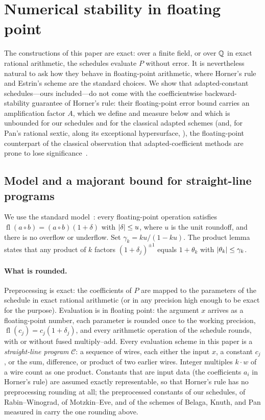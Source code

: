 \section{Numerical stability in floating point}
\label{sec:numerical-stability}

The constructions of this paper are exact: over a finite field, or over $\mathbb{Q}$ in
exact rational arithmetic, the schedules evaluate $P$ without error.  It is
nevertheless natural to ask how they behave in floating-point arithmetic,
where Horner's rule and Estrin's scheme are the standard choices.  We show
that adapted-constant schedules---ours included---do not come with the
coefficientwise backward-stability guarantee of Horner's rule: their
floating-point error bound carries an amplification factor $A$, which we
define and measure below and which is unbounded for our schedules and for
the classical adapted schemes (and, for Pan's rational sextic, along its
exceptional hypersurface, ), the floating-point
counterpart of the classical observation that adapted-coefficient methods
are prone to lose significance~\cite[\S4.6.4]{knuth1997seminumerical}.

\subsection{Model and a majorant bound for straight-line programs}

We use the standard model~\cite[Ch.~2--3]{higham2002accuracy}: every
floating-point operation satisfies
$\operatorname{fl}(a\circ b)=(a\circ b)(1+\delta)$ with $\left\lvert \delta\right\rvert\le u$,
where $u$ is the unit roundoff, and there is no overflow or underflow.  Set
$\gamma_k=ku/(1-ku)$.  The product lemma states that any product of $k$ factors
$(1+\delta_j)^{\pm1}$ equals $1+\theta_k$ with $\left\lvert \theta_k\right\rvert\le\gamma_k$.

\paragraph{What is rounded.}
Preprocessing is exact: the coefficients of $P$ are mapped to the parameters
of the schedule in exact rational arithmetic (or in any precision high enough
to be exact for the purpose).  Evaluation is in floating point: the argument
$x$ arrives as a floating-point number, each parameter is rounded once to the
working precision, $\operatorname{fl}(c_j)=c_j(1+\delta_j)$, and every
arithmetic operation of the schedule rounds, with or without fused
multiply--add.  Every evaluation scheme in this paper is a
\emph{straight-line program} $\mathcal C$: a sequence of wires, each either
the input $x$, a constant $c_j$, or the sum, difference, or product of two
earlier wires.  Integer multiples $k\cdot w$ of a wire count as one product.
Constants that are input data (the coefficients $a_i$ in Horner's rule) are
assumed exactly representable, so that Horner's rule has no preprocessing
rounding at all; the preprocessed constants of our schedules, of
Rabin--Winograd, of Motzkin--Eve, and of the schemes of Belaga, Knuth, and
Pan measured in  carry the one rounding above.

